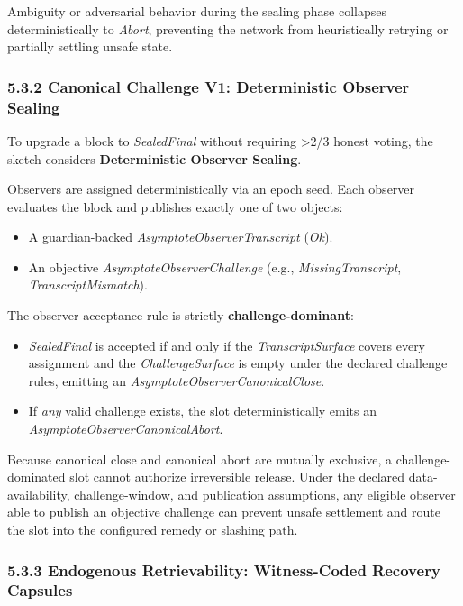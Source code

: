 \documentclass[
  11pt,
]{article}
\providecommand{\tightlist}{%
  \setlength{\itemsep}{0pt}\setlength{\parskip}{0pt}}
\begin{document}
Ambiguity or adversarial behavior during the sealing phase collapses
deterministically to \emph{Abort}, preventing the network from
heuristically retrying or partially settling unsafe state.

\hypertarget{canonical-challenge-v1-deterministic-observer-sealing}{%
\subsubsection{5.3.2 Canonical Challenge V1: Deterministic Observer
Sealing}\label{canonical-challenge-v1-deterministic-observer-sealing}}

To upgrade a block to \emph{SealedFinal} without requiring
\textgreater2/3 honest voting, the sketch considers \textbf{Deterministic
Observer Sealing}.

Observers are assigned deterministically via an epoch seed. Each
observer evaluates the block and publishes exactly one of two objects:

\begin{itemize}
\tightlist
\item
  A guardian-backed \emph{AsymptoteObserverTranscript} (\emph{Ok}).
\item
  An objective \emph{AsymptoteObserverChallenge} (e.g.,
  \emph{MissingTranscript}, \emph{TranscriptMismatch}).
\end{itemize}

The observer acceptance rule is strictly \textbf{challenge-dominant}:

\begin{itemize}
\tightlist
\item
  \emph{SealedFinal} is accepted if and only if the
  \emph{TranscriptSurface} covers every assignment and the
  \emph{ChallengeSurface} is empty under the declared challenge rules,
  emitting an
  \emph{AsymptoteObserverCanonicalClose}.
\item
  If \emph{any} valid challenge exists, the slot deterministically emits
  an \emph{AsymptoteObserverCanonicalAbort}.
\end{itemize}

Because canonical close and canonical abort are mutually exclusive, a
challenge-dominated slot cannot authorize irreversible release. Under
the declared data-availability, challenge-window, and publication
assumptions, any eligible observer able to publish an objective challenge
can prevent unsafe settlement and route the slot into the configured
remedy or slashing path.

\hypertarget{endogenous-retrievability-witness-coded-recovery-capsules}{%
\subsubsection{5.3.3 Endogenous Retrievability: Witness-Coded Recovery
Capsules}\label{endogenous-retrievability-witness-coded-recovery-capsules}}
\end{document}
